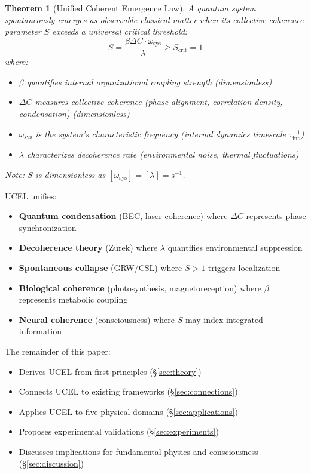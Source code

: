 \documentclass[12pt,a4paper]{article}
\newtheorem{theorem}{Theorem}
\begin{document}
\begin{theorem}[Unified Coherent Emergence Law]
A quantum system spontaneously emerges as observable classical matter when its collective coherence parameter $S$ exceeds a universal critical threshold:
\begin{equation}
S = \frac{\beta \Delta C \cdot \omega_{\text{sys}}}{\lambda} \geq S_{\text{crit}} = 1
\label{eq:ucel_main}
\end{equation}
where:
\begin{itemize}
    \item $\beta$ quantifies internal organizational coupling strength (dimensionless)
    \item $\Delta C$ measures collective coherence (phase alignment, correlation density, condensation) (dimensionless)
    \item $\omega_{\text{sys}}$ is the system's characteristic frequency (internal dynamics timescale $\tau_{\text{int}}^{-1}$)
    \item $\lambda$ characterizes decoherence rate (environmental noise, thermal fluctuations)
\end{itemize}
Note: $S$ is dimensionless as $[\omega_{\text{sys}}] = [\lambda] = \text{s}^{-1}$.
\end{theorem}

UCEL unifies:
\begin{itemize}
    \item \textbf{Quantum condensation} (BEC, laser coherence) where $\Delta C$ represents phase synchronization
    \item \textbf{Decoherence theory} (Zurek) where $\lambda$ quantifies environmental suppression
    \item \textbf{Spontaneous collapse} (GRW/CSL) where $S > 1$ triggers localization
    \item \textbf{Biological coherence} (photosynthesis, magnetoreception) where $\beta$ represents metabolic coupling
    \item \textbf{Neural coherence} (consciousness) where $S$ may index integrated information
\end{itemize}

The remainder of this paper:
\begin{itemize}
    \item Derives UCEL from first principles (\S\ref{sec:theory})
    \item Connects UCEL to existing frameworks (\S\ref{sec:connections})
    \item Applies UCEL to five physical domains (\S\ref{sec:applications})
    \item Proposes experimental validations (\S\ref{sec:experiments})
    \item Discusses implications for fundamental physics and consciousness (\S\ref{sec:discussion})
\end{itemize}
\end{document}
